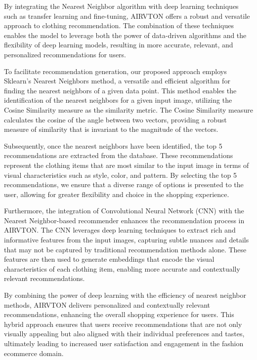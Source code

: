     By integrating the Nearest Neighbor algorithm with deep learning techniques such as transfer learning and fine-tuning, AIRVTON offers a robust and versatile approach to clothing recommendation. The combination of these techniques enables the model to leverage both the power of data-driven algorithms and the flexibility of deep learning models, resulting in more accurate, relevant, and personalized recommendations for users.


	To facilitate recommendation generation, our proposed approach employs Sklearn's Nearest Neighbors method, a versatile and efficient algorithm for finding the nearest neighbors of a given data point. This method enables the identification of the nearest neighbors for a given input image, utilizing the Cosine Similarity measure as the similarity metric. The Cosine Similarity measure calculates the cosine of the angle between two vectors, providing a robust measure of similarity that is invariant to the magnitude of the vectors.

    Subsequently, once the nearest neighbors have been identified, the top 5 recommendations are extracted from the database. These recommendations represent the clothing items that are most similar to the input image in terms of visual characteristics such as style, color, and pattern. By selecting the top 5 recommendations, we ensure that a diverse range of options is presented to the user, allowing for greater flexibility and choice in the shopping experience.

    Furthermore, the integration of Convolutional Neural Network (CNN) with the Nearest Neighbor-based recommender enhances the recommendation process in AIRVTON. The CNN leverages deep learning techniques to extract rich and informative features from the input images, capturing subtle nuances and details that may not be captured by traditional recommendation methods alone. These features are then used to generate embeddings that encode the visual characteristics of each clothing item, enabling more accurate and contextually relevant recommendations.

    By combining the power of deep learning with the efficiency of nearest neighbor methods, AIRVTON delivers personalized and contextually relevant recommendations, enhancing the overall shopping experience for users. This hybrid approach ensures that users receive recommendations that are not only visually appealing but also aligned with their individual preferences and tastes, ultimately leading to increased user satisfaction and engagement in the fashion ecommerce domain.


